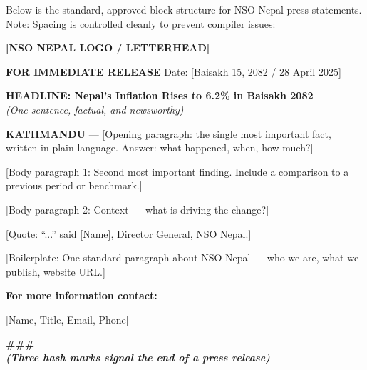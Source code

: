 \documentclass[11pt,a4paper,oneside]{book}
\begin{document}
Below is the standard, approved block structure for NSO Nepal press statements. Note: Spacing is controlled cleanly to prevent compiler issues:

\begin{tcolorbox}[nsoshadedbox, title=\textbf{Standard NSO Press Release Template}]
\begin{center}
  \bfseries\color{nsoblue}
  [NSO NEPAL LOGO / LETTERHEAD]
\end{center}
\vspace{0.2cm}

\normalfont\small
\textbf{FOR IMMEDIATE RELEASE} \hfill Date: [Baisakh 15, 2082 / 28 April 2025]
\vspace{0.4cm}

\begin{center}
  {\large\bfseries\color{nsored} HEADLINE: Nepal's Inflation Rises to 6.2\% in Baisakh 2082}\\
  {\small\itshape (One sentence, factual, and newsworthy)}
\end{center}
\vspace{0.4cm}

\textbf{KATHMANDU} --- [Opening paragraph: the single most important fact, written in plain language. Answer: what happened, when, how much?]

\vspace{0.3cm}
[Body paragraph 1: Second most important finding. Include a comparison to a previous period or benchmark.]

\vspace{0.3cm}
[Body paragraph 2: Context --- what is driving the change?]

\vspace{0.3cm}
[Quote: ``...'' said [Name], Director General, NSO Nepal.]

\vspace{0.3cm}
[Boilerplate: One standard paragraph about NSO Nepal --- who we are, what we publish, website URL.]

\vspace{0.5cm}
\textbf{For more information contact:}

[Name, Title, Email, Phone]

\vspace{0.6cm}
\begin{center}
  \bfseries\color{nsored}
  \#\#\#\\
  \small\itshape (Three hash marks signal the end of a press release)
\end{center}
\end{tcolorbox}
\end{document}
